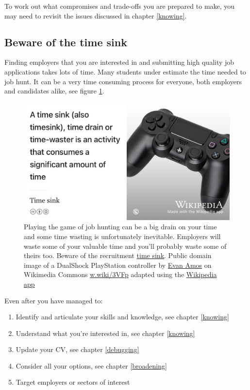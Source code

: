 \documentclass[
]{book}
\providecommand{\tightlist}{%
  \setlength{\itemsep}{0pt}\setlength{\parskip}{0pt}}
\begin{document}
To work out what compromises and trade-offs you are prepared to make, you may need to revisit the issues discussed in chapter \ref{knowing}. 🤔

\hypertarget{timesink}{%
\subsection{Beware of the time sink}\label{timesink}}

Finding employers that you are interested in and submitting high quality job applications takes lots of time. Many students under estimate the time needed to job hunt. It can be a very time consuming process for everyone, both employers and candidates alike, see figure \ref{fig:timesink-fig}.

\begin{figure}

{\centering \includegraphics[width=0.98\linewidth]{images/timesink} 

}

\caption{Playing the game of job hunting can be a big drain on your time and some time wasting is unfortunately inevitable. Employers will waste some of your valuable time and you'll probably waste some of theirs too. Beware of the recruitment \href{https://en.wikipedia.org/wiki/Time_sink}{time sink}. Public domain image of a DualShock PlayStation controller by \href{https://en.wikipedia.org/wiki/Evan_Amos}{Evan Amos} on Wikimedia Commons \href{https://w.wiki/3VFp}{w.wiki/3VFp} adapted using the \href{https://apps.apple.com/gb/app/wikipedia/id324715238}{Wikipedia app}}\label{fig:timesink-fig}
\end{figure}



Even after you have managed to:

\begin{enumerate}
\def\labelenumi{\arabic{enumi}.}
\tightlist
\item
  Identify and articulate your skills and knowledge, see chapter \ref{knowing}
\item
  Understand what you're interested in, see chapter \ref{knowing}
\item
  Update your CV, see chapter \ref{debugging}
\item
  Consider all your options, see chapter \ref{broadening}
\item
  Target employers or sectors of interest
\end{enumerate}
\end{document}
